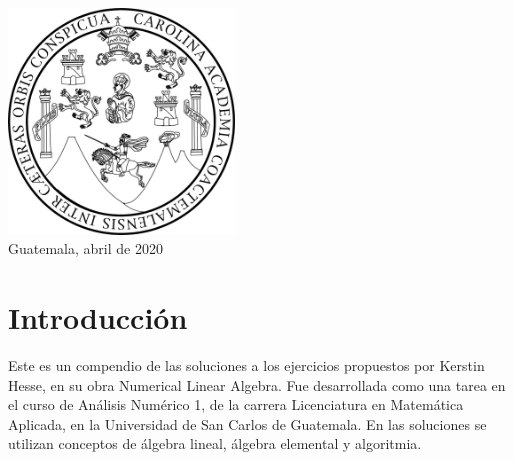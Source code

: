 \documentclass[12pt]{book}
\begin{document}
\begin{titlepage}

\includegraphics[width=6cm]{img.jpg}\\[1cm] %
 

{\large Guatemala, abril de 2020}\\[2cm] %



\vfill 

\end{titlepage}


\thispagestyle{empty}
\tableofcontents
\chapter*{Introducción}
 
Este es un compendio de las soluciones a los ejercicios propuestos por Kerstin Hesse, en su obra Numerical Linear Algebra. Fue desarrollada como una tarea en el curso de Análisis Numérico 1, de la carrera Licenciatura en Matemática Aplicada, en la Universidad de San Carlos de Guatemala. En las soluciones se utilizan conceptos de álgebra lineal, álgebra elemental y algoritmia.
\end{document}
